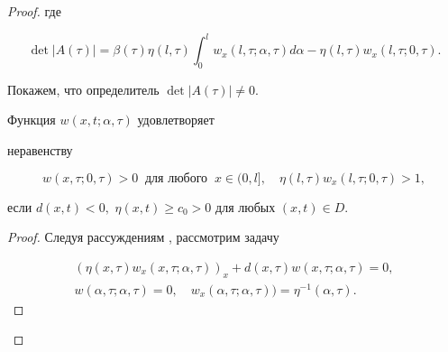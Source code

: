 \begin{proof}
где

$$

\det|

A(\tau)|=\beta(\tau)\eta(l,\tau)\int^{l}_{0}w_{x}(l,\tau;\alpha,\tau)d\alpha-

\eta(l,\tau)w_{x}(l,\tau;0,\tau).

$$





\noindent

Покажем, что определитель $\det |A(\tau)|\neq 0$. %






\begin{lemma}[1]


Функция $w(x,t;\alpha,\tau)$ удовлетворяет

неравенству

$$

w(x,\tau;0,\tau) >0\ \text{ для любого }\ x \in (0,l],\quad

\eta(l,\tau)w_{x}(l,\tau;0,\tau) >1,

$$

если $d(x,t)<0,$ $\eta(x,t)\geq c_{0} >0$ для любых $(x,t) \in D.$

\end{lemma}



\smallskip



\begin{proof} Следуя рассуждениям \cite{besh:bib:Shhanukov}, рассмотрим задачу

\begin{gather}

(\eta(x,\tau)w_{x}(x,\tau;\alpha,\tau))_{x}

+d(x,\tau)w(x,\tau;\alpha,\tau)=0,

\label{besh:16}

\\

w(\alpha,\tau;\alpha,\tau)=0,

\quad 

w_{x}(\alpha,\tau;\alpha,\tau))={\eta^{-1}(\alpha,\tau)}.

\end{gather}




\end{proof}
\end{proof}

